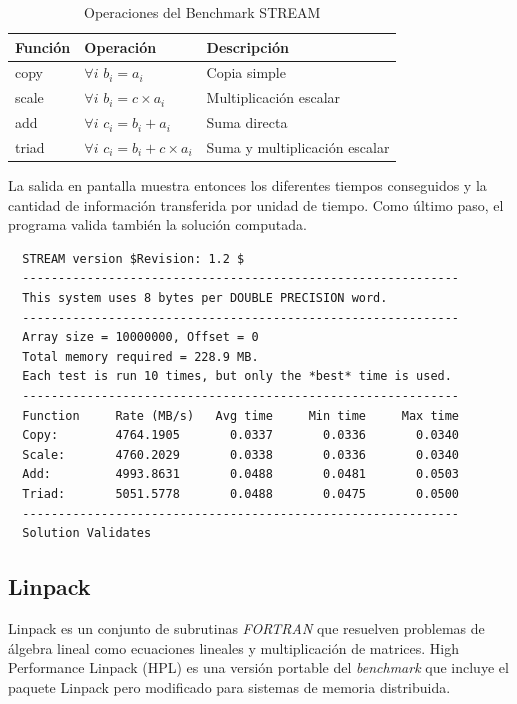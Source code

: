 \documentclass[a4paper]{report}
\begin{document}
\begin{table}[H]
\caption{Operaciones del Benchmark STREAM}
  \centering
    \begin{tabular}{|l|l|l|}\hline
      {\bf Función} & {\bf Operación} & {\bf Descripción} \\ \hline
      copy & $ \forall i $ $ b_{i} = a_{i} $ & Copia simple \\ \hline
      scale & $ \forall i $ $ b_{i} = c \times a_{i} $ & Multiplicación escalar \\ \hline
      add & $ \forall i $ $ c_{i} = b_{i} + a_{i} $ & Suma directa \\ \hline
      triad & $ \forall i $ $ c_{i} = b_{i} + c \times a_{i} $ & Suma y multiplicación escalar \\ \hline
    \end{tabular} 
 \label{table:stream}
\end{table}

La salida en pantalla muestra entonces los diferentes tiempos conseguidos y la cantidad de información transferida por unidad de tiempo.
Como último paso, el programa valida también la solución computada.

{\small
\begin{verbatim}
  STREAM version $Revision: 1.2 $
  -------------------------------------------------------------
  This system uses 8 bytes per DOUBLE PRECISION word.
  -------------------------------------------------------------
  Array size = 10000000, Offset = 0
  Total memory required = 228.9 MB.
  Each test is run 10 times, but only the *best* time is used.
  -------------------------------------------------------------
  Function     Rate (MB/s)   Avg time     Min time     Max time
  Copy:        4764.1905       0.0337       0.0336       0.0340
  Scale:       4760.2029       0.0338       0.0336       0.0340
  Add:         4993.8631       0.0488       0.0481       0.0503
  Triad:       5051.5778       0.0488       0.0475       0.0500
  -------------------------------------------------------------
  Solution Validates
\end{verbatim}
}

\subsection{Linpack}

Linpack \cite{linpack} es un conjunto de subrutinas {\it FORTRAN} que resuelven
problemas de álgebra lineal como ecuaciones lineales y multiplicación de
matrices. High Performance Linpack (HPL) \cite{hpl} es una versión portable del {\it benchmark} que incluye
el paquete Linpack pero modificado para sistemas de memoria distribuida.
\end{document}
